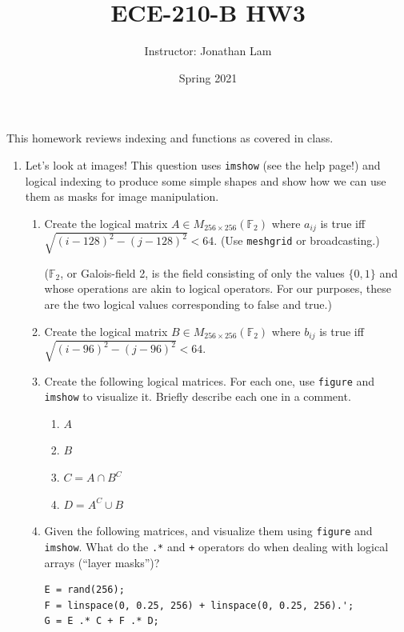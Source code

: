 \documentclass{article}
\title{ECE-210-B HW3}
\author{Instructor: Jonathan Lam}
\date{Spring 2021}
\begin{document}
	\maketitle
	
	\noindent This homework reviews indexing and functions as covered in class.
	
	\begin{enumerate}
		\item
		Let's look at images! This question uses \lstinline|imshow| (see the help page!) and logical indexing to produce some simple shapes and show how we can use them as masks for image manipulation.
		
		\begin{enumerate}
			\item Create the logical matrix $A\in M_{256\times 256}(\mathbb{F}_2)$ where $a_{ij}$ is true iff $\sqrt{(i-128)^2-(j-128)^2}<64$. (Use \lstinline|meshgrid| or broadcasting.)
			
			($\mathbb{F}_2$, or Galois-field 2, is the field consisting of only the values $\{0,1\}$ and whose operations are akin to logical operators. For our purposes, these are the two logical values corresponding to false and true.)
			
			\item Create the logical matrix $B\in M_{256\times 256}(\mathbb{F}_2)$ where $b_{ij}$ is true iff $\sqrt{(i-96)^2-(j-96)^2}<64$.
			
			\item Create the following logical matrices. For each one, use \lstinline|figure| and \lstinline|imshow| to visualize it. Briefly describe each one in a comment.
			\begin{enumerate}
				\item $A$
				\item $B$
				\item $C=A\cap B^C$
				\item $D=A^C\cup B$
			\end{enumerate}
		
			\item Given the following matrices, and visualize them using \lstinline|figure| and \lstinline|imshow|. What do the \lstinline|.*| and \lstinline|+| operators do when dealing with logical arrays (``layer masks'')?
			\begin{lstlisting}
E = rand(256);
F = linspace(0, 0.25, 256) + linspace(0, 0.25, 256).';
G = E .* C + F .* D;
			\end{lstlisting}
			

\end{enumerate}
\end{enumerate}
\end{document}
